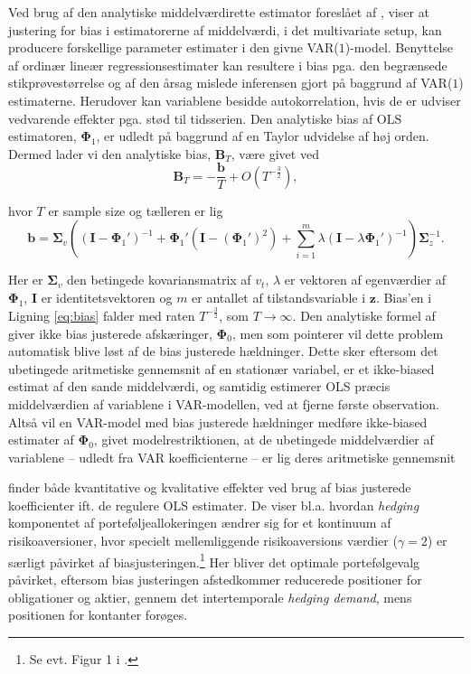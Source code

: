 \documentclass[
  a4paper,
  oneside]{memoir}
\begin{document}
Ved brug af den analytiske middelværdirette estimator foreslået af \citep{Pope1990}, viser \citep{Engsted2012} at justering for bias i estimatorerne af middelværdi, i det multivariate setup, kan producere forskellige parameter estimater i den givne VAR(\(1\))-model. Benyttelse af ordinær lineær regressionsestimater kan resultere i bias pga. den begrænsede stikprøvestørrelse og af den årsag mislede inferensen gjort på baggrund af VAR(\(1\)) estimaterne. Herudover kan variablene besidde autokorrelation, hvis de er udviser vedvarende effekter pga. stød til tidsserien. Den analytiske bias af OLS estimatoren, \(\bm{\Phi}_1\), er udledt på baggrund af en Taylor udvidelse af høj orden. Dermed lader vi den analytiske bias, \(\bm{B}_T\), være givet ved
\begin{equation}
\bm{B}_T=-\frac{\bm{b}}{T}+ O\left(T^{-\frac{3}{2}}\right), \label{eq:bias}
\end{equation}

hvor \(T\) er sample size og tælleren er lig
\[\bm{b}=\bm{\Sigma}_v\left(\left(\bm{I}-\bm{\Phi}_1'\right)^{-1}+\bm{\Phi}_1'\left(\bm{I}-\left(\bm{\Phi}_1'\right)^2\right)+\sum_{i=1}^m \lambda \left(\bm{I}-\lambda\bm{\Phi}_1'\right)^{-1}\right)\bm{\Sigma}_z^{-1}.\]

Her er \(\bm{\Sigma}_v\) den betingede kovariansmatrix af \(v_t\), \(\lambda\) er vektoren af egenværdier af \(\bm{\Phi}_1\), \(\bm{I}\) er identitetsvektoren og \(m\) er antallet af tilstandsvariable i \(\bm{z}\). Bias'en i Ligning \eqref{eq:bias} falder med raten \(T^{-\frac{3}{2}}\), som \(T\rightarrow \infty\). Den analytiske formel af \citep{Pope1990} giver ikke bias justerede afskæringer, \(\bm{\Phi}_0\), men som \citep{Engsted2012} pointerer vil dette problem automatisk blive løst af de bias justerede hældninger. Dette sker eftersom det ubetingede aritmetiske gennemsnit af en stationær variabel, er et ikke-biased estimat af den sande middelværdi, og samtidig estimerer OLS præcis middelværdien af variablene i VAR-modellen, ved at fjerne første observation. Altså vil en VAR-model med bias justerede hældninger medføre ikke-biased estimater af \(\bm{\Phi}_0\), givet modelrestriktionen, at de ubetingede middelværdier af variablene -- udledt fra VAR koefficienterne -- er lig deres aritmetiske gennemsnit

\citep{Engsted2012} finder både kvantitative og kvalitative effekter ved brug af bias justerede koefficienter ift. de regulere OLS estimater. De viser bl.a. hvordan \emph{hedging} komponentet af porteføljeallokeringen ændrer sig for et kontinuum af risikoaversioner, hvor specielt mellemliggende risikoaversions værdier (\(\gamma=2\)) er særligt påvirket af biasjusteringen.\footnote{Se evt. Figur 1 i \citep{Engsted2012}.} Her bliver det optimale portefølgevalg påvirket, eftersom bias justeringen afstedkommer reducerede positioner for obligationer og aktier, gennem det intertemporale \emph{hedging demand}, mens positionen for kontanter forøges.
\end{document}
